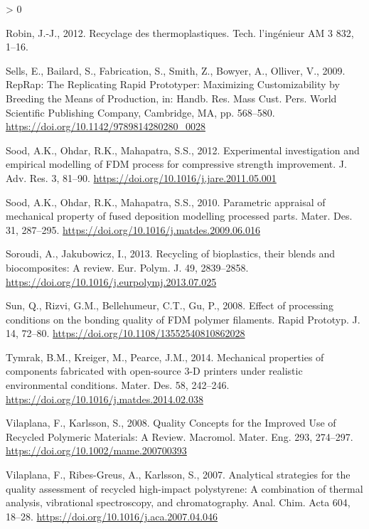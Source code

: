 \documentclass[
]{article}
\newlength{\cslhangindent}
\newenvironment{CSLReferences}[2] %
 {%
  \setlength{\parindent}{0pt}
  \ifodd #1 \everypar{\setlength{\hangindent}{\cslhangindent}}\ignorespaces\fi
  \ifnum #2 > 0
  \setlength{\parskip}{#2\baselineskip}
  \fi
 }%
 {}
\begin{document}
\begin{CSLReferences}{1}{0}
\leavevmode\hypertarget{ref-Robin2012}{}%
Robin, J.-J., 2012. {Recyclage des thermoplastiques}. Tech. l'ing{é}nieur AM 3 832, 1--16.

\leavevmode\hypertarget{ref-Sells2009a}{}%
Sells, E., Bailard, S., Fabrication, S., Smith, Z., Bowyer, A., Olliver, V., 2009. {RepRap: The Replicating Rapid Prototyper: Maximizing Customizability by Breeding the Means of Production}, in: Handb. Res. Mass Cust. Pers. World Scientific Publishing Company, Cambridge, MA, pp. 568--580. \url{https://doi.org/10.1142/9789814280280_0028}

\leavevmode\hypertarget{ref-Sood2012}{}%
Sood, A.K., Ohdar, R.K., Mahapatra, S.S., 2012. {Experimental investigation and empirical modelling of FDM process for compressive strength improvement}. J. Adv. Res. 3, 81--90. \url{https://doi.org/10.1016/j.jare.2011.05.001}

\leavevmode\hypertarget{ref-Sood2010}{}%
Sood, A.K., Ohdar, R.K., Mahapatra, S.S., 2010. {Parametric appraisal of mechanical property of fused deposition modelling processed parts}. Mater. Des. 31, 287--295. \url{https://doi.org/10.1016/j.matdes.2009.06.016}

\leavevmode\hypertarget{ref-Soroudi2013}{}%
Soroudi, A., Jakubowicz, I., 2013. {Recycling of bioplastics, their blends and biocomposites: A review}. Eur. Polym. J. 49, 2839--2858. \url{https://doi.org/10.1016/j.eurpolymj.2013.07.025}

\leavevmode\hypertarget{ref-Sun2008}{}%
Sun, Q., Rizvi, G.M., Bellehumeur, C.T., Gu, P., 2008. {Effect of processing conditions on the bonding quality of FDM polymer filaments}. Rapid Prototyp. J. 14, 72--80. \url{https://doi.org/10.1108/13552540810862028}

\leavevmode\hypertarget{ref-Tymrak2014a}{}%
Tymrak, B.M., Kreiger, M., Pearce, J.M., 2014. {Mechanical properties of components fabricated with open-source 3-D printers under realistic environmental conditions}. Mater. Des. 58, 242--246. \url{https://doi.org/10.1016/j.matdes.2014.02.038}

\leavevmode\hypertarget{ref-Vilaplana2008}{}%
Vilaplana, F., Karlsson, S., 2008. {Quality Concepts for the Improved Use of Recycled Polymeric Materials: A Review}. Macromol. Mater. Eng. 293, 274--297. \url{https://doi.org/10.1002/mame.200700393}

\leavevmode\hypertarget{ref-Vilaplana2007}{}%
Vilaplana, F., Ribes-Greus, A., Karlsson, S., 2007. {Analytical strategies for the quality assessment of recycled high-impact polystyrene: A combination of thermal analysis, vibrational spectroscopy, and chromatography}. Anal. Chim. Acta 604, 18--28. \url{https://doi.org/10.1016/j.aca.2007.04.046}


\end{CSLReferences}
\end{document}
